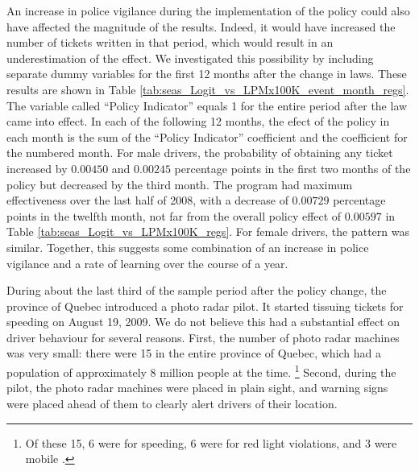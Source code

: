 An increase in police vigilance during the implementation of the policy 
could also have affected the magnitude of the results. 
Indeed, it would have increased the number of tickets written in that period, 
which would result in an underestimation of the effect. 
% 
% 
We investigated this possibility by including separate dummy variables
for the first 12 months after the change in laws. 
These results are shown in 
Table \ref{tab:seas_Logit_vs_LPMx100K_event_month_regs}. 
The variable called ``Policy Indicator'' equals 1 for the entire period after
the law came into effect. 
In each of the following 12 months, the efect of the policy in each month 
is the sum of the ``Policy Indicator'' coefficient 
and the coefficient for the numbered month. 
% 
For male drivers, the probability of obtaining any ticket increased by 
$0.00450$ and $0.00245$ percentage points in the first two months of the policy
but decreased by the third month. 
The program had maximum effectiveness over the last half of 2008, 
with a decrease of $0.00729$ percentage points in the twelfth month, 
not far from the overall policy effect of $0.00597$ in 
Table \ref{tab:seas_Logit_vs_LPMx100K_regs}. 
% 
For female drivers, the pattern was similar. 
% 
Together, this suggests some combination of an increase in police vigilance 
and a rate of learning over the course of a year. 



During about the last third of the sample period after the policy change, 
the province of Quebec introduced a photo radar pilot. 
It started tissuing tickets for speeding on August 19, 2009. 
We do not believe this had a substantial effect on driver behaviour for several reasons. 
First, the number of photo radar machines was very small: 
there were 15 in the entire province of Quebec, 
which had a population of approximately 8 million people at the time.%
\footnote{%
Of these 15, 6 were for speeding, 6 were for red light violations, and 3 were mobile 
\citet{bisson2020}.
}  
%
Second, during the pilot, 
the photo radar machines were placed in plain sight, 
and warning signs were placed ahead of them to clearly alert drivers of their location.


